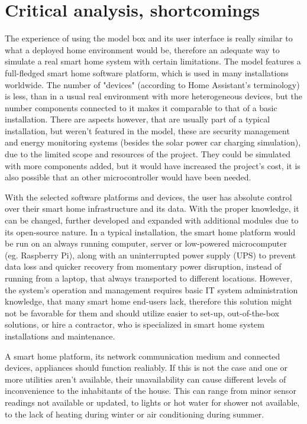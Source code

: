 \section{Critical analysis, shortcomings}

The experience of using the model box and its user interface is really similar to what a deployed home environment would be, therefore an adequate way to simulate a real smart home system with certain limitations. The model features a full-fledged smart home software platform, which is used in many installations worldwide. %
The number of "devices" (according to Home Assistant's terminology) is less, than in a usual real environment with more heterogeneous devices, but the number components connected to it makes it comparable to that of a basic installation.
There are aspects however, that are usually part of a typical installation, but weren't featured in the model, these are security management and energy monitoring systems (besides the solar power car charging simulation), due to the limited scope and resources of the project. They could be simulated with more components added, but it would have increased the project's cost, it is also possible that an other microcontroller would have been needed.

With the selected software platforms and devices, the user has absolute control over their smart home infrastructure and its data. With the proper knowledge, it can be changed, further developed and expanded with additional modules due to its open-source nature. In a typical installation, the smart home platform would be run on an always running computer, server or low-powered microcomputer (eg. Raspberry Pi), along with an uninterrupted power supply (UPS) to prevent data loss and quicker recovery from momentary power disruption, instead of running from a laptop, that always transported to different locations. However, the system's operation and management requires basic IT system administration knowledge, that many smart home end-users lack, therefore this solution might not be favorable for them and should utilize easier to set-up, out-of-the-box solutions, or hire a contractor, who is specialized in smart home system installations and maintenance.

A smart home platform, its network communication medium and connected devices, appliances should function realiably. If this is not the case and one or more utilities aren't available, their unavailability can cause different levels of inconvenience to the inhabitants of the house. This can range from minor sensor readings not available or updated, to lights or hot water for shower not available, to the lack of heating during winter or air conditioning during summer.

